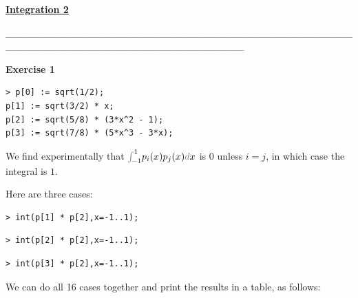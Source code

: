 \documentclass{article}
\begin{document}
\lstset{basicstyle=\ttfamily,breaklines=true,columns=flexible}
\pagestyle{empty}
\begin{center}
\begin{Maple Normal}
\underline{\textbf{Integration 2}}
\end{Maple Normal}
\end{center}
\begin{Maple Normal}
\_\_\_\_\_\_\_\_\_\_\_\_\_\_\_\_\_\_\_\_\_\_\_\_\_\_\_\_\_\_\_\_\_\_\_\_\_\_\_\_\_\_\_\_\_\_\_\_\_\_\_\_\_\_\_\_\_\_\_\_\_\_\_\_\_\_\_\_\_\_\_\_\_\_\_\_\_\_\_\_\_
\end{Maple Normal}
\begin{Maple Normal}
\textbf{Exercise 1}
\end{Maple Normal}
\begin{lstlisting}
> p[0] := sqrt(1/2);
p[1] := sqrt(3/2) * x;
p[2] := sqrt(5/8) * (3*x^2 - 1);
p[3] := sqrt(7/8) * (5*x^3 - 3*x);
\end{lstlisting}
\begin{Maple Normal}
We find experimentally that 
${\textcolor{gray}{\int}}_{\!\!-1}^{1}p_{i}(x) p_{j}(x)\textcolor{gray}{d}x$ is 
$0$ unless 
$i =j$, in which case the integral is 
$1$.\

Here are three cases:
\end{Maple Normal}
\begin{lstlisting}
> int(p[1] * p[2],x=-1..1);
\end{lstlisting}
\begin{lstlisting}
> int(p[2] * p[2],x=-1..1);
\end{lstlisting}
\begin{lstlisting}
> int(p[3] * p[2],x=-1..1);
\end{lstlisting}
\begin{Maple Normal}
We can do all 16 cases together and print the results in a table, as follows:
\end{Maple Normal}
\end{document}
